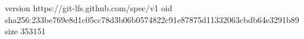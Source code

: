 version https://git-lfs.github.com/spec/v1
oid sha256:233be769e8d1c05cc78d3b06b0574822c91e87875d11332063cbdb64e3291b89
size 353151
